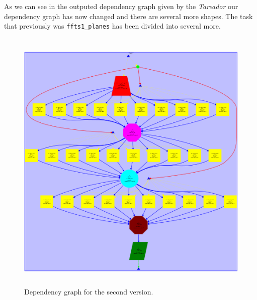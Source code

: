 \documentclass[12]{article}
\begin{document}
As we can see in the outputed dependency graph given by the \textit{Tareador} our dependency graph has now changed and there are several more shapes. The task that previously was \texttt{ffts1\_planes} has been divided into several more. 
\begin{figure}[H]
\centering  \includegraphics[width=\linewidth , height=13cm, width=13cm ]{dependency_graph2.png}
  \caption{Dependency graph for the second version.}
  \label{fig:Depencency2nd}
\end{figure}
\end{document}
